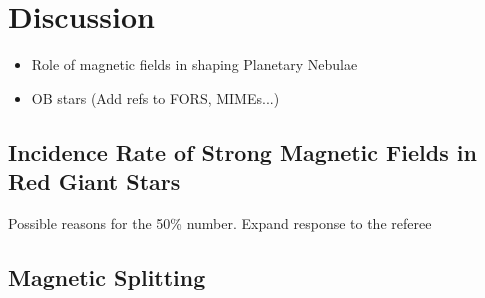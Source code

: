 \section{Discussion}
\begin{itemize}
\item Role of magnetic fields in shaping Planetary Nebulae
\item OB stars (Add refs to FORS, MIMEs...)
\end{itemize}

\subsection{Incidence Rate of Strong Magnetic Fields in Red Giant Stars}
Possible reasons for the 50\% number. Expand response to the referee
\subsection{Magnetic Splitting}
